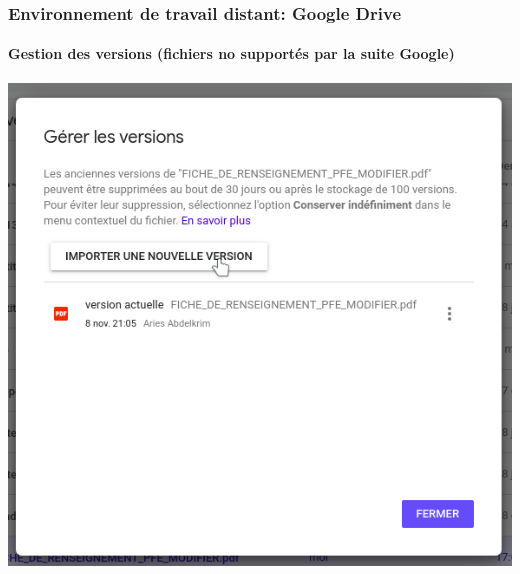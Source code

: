 \documentclass[xcolor=table]{beamer}
\begin{document}
\begin{frame}
\frametitle{Environnement de travail distant: Google Drive}
\framesubtitle{Gestion des versions (fichiers no supportés par la suite Google)}

\begin{center}
	\includegraphics[height=
	.8\textheight]{../img/Bweb01-environnement/drive-version.png}
\end{center}

\end{frame}
\end{document}
